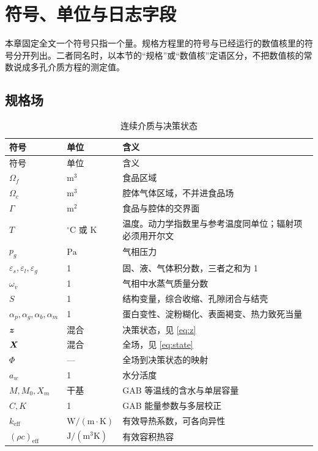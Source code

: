 \chapter{符号、单位与日志字段}
\label{app:symbols}

本章固定全文一个符号只指一个量。规格方程里的符号与已经运行的数值核里的符号分开列出。二者同名时，以本节的“规格”或“数值核”定语区分，不把数值核的常数说成多孔介质方程的测定值。

\section{规格场}

\begin{longtable}{llp{8.2cm}}
\caption{连续介质与决策状态}\\
\toprule
符号 & 单位 & 含义 \\
\midrule
\endfirsthead
\toprule
符号 & 单位 & 含义 \\
\midrule
\endhead
\(\Omega_f\) & \(\mathrm{m}^3\) & 食品区域 \\
\(\Omega_c\) & \(\mathrm{m}^3\) & 腔体气体区域，不并进食品场 \\
\(\Gamma\) & \(\mathrm{m}^2\) & 食品与腔体的交界面 \\
\(T\) & \(^\circ\mathrm{C}\) 或 \(\mathrm{K}\) & 温度。动力学指数里与参考温度同单位；辐射项必须用开尔文 \\
\(p_g\) & \(\mathrm{Pa}\) & 气相压力 \\
\(\varepsilon_s,\varepsilon_l,\varepsilon_g\) & 1 & 固、液、气体积分数，三者之和为 1 \\
\(\omega_v\) & 1 & 气相中水蒸气质量分数 \\
\(S\) & 1 & 结构变量，综合收缩、孔隙闭合与结壳 \\
\(\alpha_p,\alpha_g,\alpha_b,\alpha_m\) & 1 & 蛋白变性、淀粉糊化、表面褐变、热力致死当量 \\
\(\bm{z}\) & 混合 & 决策状态，见 \eqref{eq:z} \\
\(\bm{X}\) & 混合 & 全场，见 \eqref{eq:state} \\
\(\Phi\) & — & 全场到决策状态的映射 \\
\(a_w\) & 1 & 水分活度 \\
\(M,M_0,X_m\) & 干基 & GAB 等温线的含水与单层容量 \\
\(C,K\) & 1 & GAB 能量参数与多层校正 \\
\(k_{\mathrm{eff}}\) & \(\mathrm{W}/(\mathrm{m\cdot K})\) & 有效导热系数，可各向异性 \\
\((\rho c)_{\mathrm{eff}}\) & \(\mathrm{J}/(\mathrm{m}^3\mathrm{K})\) & 有效容积热容 \\

\end{longtable}
